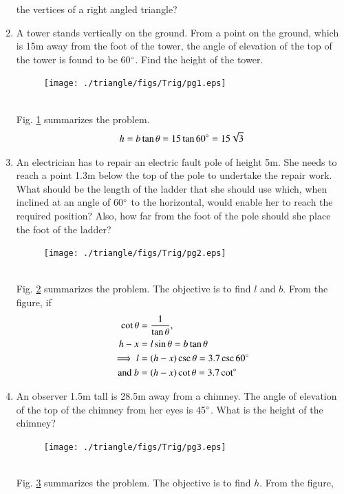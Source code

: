 \begin{enumerate}[label=\arabic*.,ref=\thesubsection.\theenumi]
%
the vertices of a right angled triangle?
%
\item A tower stands vertically on the ground.  From a point on the ground, which is 15m away from the foot of the tower, the angle of elevation of the top of the tower is found to be 60$\degree$.  Find the height of the tower.
%
\begin{figure}[!ht]
\texttt{[image: ./triangle/figs/Trig/pg1.eps]}
\caption{}
\label{fig:trig_pg1}
\end{figure}
%
\\
\solution Fig. \ref{fig:trig_pg1} summarizes the problem. 
%
\begin{align}
h = b\tan\theta = 15\tan60\degree = 15\sqrt{3}
\end{align}
%
\item An electrician has to repair an electric fault pole of height 5m.  She needs to reach a point 1.3m below the top of the pole to undertake the repair work.  What should be the length of the ladder that she should use which, when inclined at an angle of 60$\degree$ to the horizontal, would enable her to reach the required position?  Also, how far from the foot of the pole should she place the foot of the ladder?
%
\begin{figure}[!ht]
\texttt{[image: ./triangle/figs/Trig/pg2.eps]}
\caption{}
\label{fig:trig_pg2}
\end{figure}
%
\\
\solution Fig. \ref{fig:trig_pg2} summarizes the problem. The objective is to find $l$ and $b$.  From the figure,
%
if 
\begin{align}
\cot \theta &=\frac{1}{\tan \theta},
\\
h-x &= l\sin \theta = b\tan \theta
\\
\implies l &= \left(h-x\right)\csc \theta = 3.7\csc60\degree 
\\
\text{and } b&=\left(h-x\right)\cot\theta = 3.7 \cot \degree 
\end{align}
\item An observer 1.5m tall is 28.5m away from a chimney.  The angle of elevation of the top of the chimney from her eyes is 45$\degree$.  What is the height of the chimney?
%
%
\begin{figure}[!ht]
\texttt{[image: ./triangle/figs/Trig/pg3.eps]}
\caption{}
\label{fig:trig_pg3}
\end{figure}
%
\\
\solution Fig. \ref{fig:trig_pg3} summarizes the problem. The objective is to find $h$.  From the figure,
%
\begin{align}

\end{align}
\end{enumerate}
